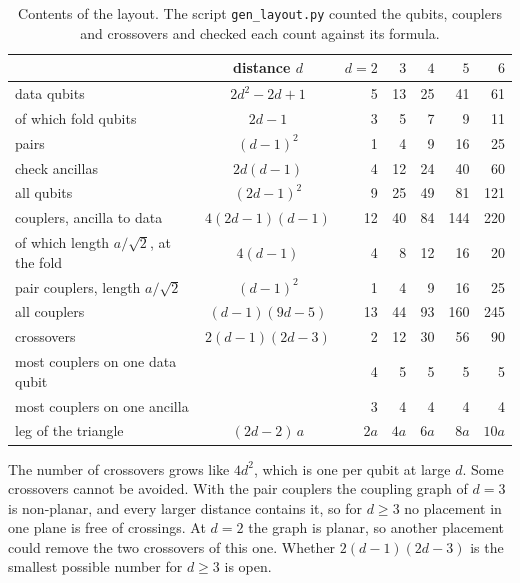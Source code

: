 \documentclass[11pt,a4paper]{article}
\begin{document}
\begin{table}[!ht]
\centering
\begin{tabular}{@{}lcrrrrr@{}}
\toprule
 & distance $d$ & $d=2$ & $3$ & $4$ & $5$ & $6$\\
\midrule
data qubits & $2d^2-2d+1$ & 5 & 13 & 25 & 41 & 61\\
\quad of which fold qubits & $2d-1$ & 3 & 5 & 7 & 9 & 11\\
\quad pairs & $(d-1)^2$ & 1 & 4 & 9 & 16 & 25\\
check ancillas & $2d(d-1)$ & 4 & 12 & 24 & 40 & 60\\
all qubits & $(2d-1)^2$ & 9 & 25 & 49 & 81 & 121\\
\midrule
couplers, ancilla to data & $4(2d-1)(d-1)$ & 12 & 40 & 84 & 144 & 220\\
\quad of which length $a/\sqrt2$, at the fold & $4(d-1)$ & 4 & 8 & 12 & 16 & 20\\
pair couplers, length $a/\sqrt2$ & $(d-1)^2$ & 1 & 4 & 9 & 16 & 25\\
all couplers & $(d-1)(9d-5)$ & 13 & 44 & 93 & 160 & 245\\
crossovers & $2(d-1)(2d-3)$ & 2 & 12 & 30 & 56 & 90\\
\midrule
most couplers on one data qubit & & 4 & 5 & 5 & 5 & 5\\
most couplers on one ancilla & & 3 & 4 & 4 & 4 & 4\\
leg of the triangle & $(2d-2)\,a$ & $2a$ & $4a$ & $6a$ & $8a$ & $10a$\\
\bottomrule
\end{tabular}
\caption{Contents of the layout. The script \texttt{gen\_layout.py} counted the qubits,
couplers and crossovers and checked each count against its formula.}
\label{tab:counts}
\end{table}

The number of crossovers grows like $4d^2$, which is one per qubit at large $d$. Some crossovers
cannot be avoided. With the pair couplers the coupling graph of $d=3$ is non-planar, and every
larger distance contains it, so for $d\ge3$ no placement in one plane is free of crossings.
At $d=2$ the graph is planar, so another placement could remove the two crossovers of this one.
Whether $2(d-1)(2d-3)$ is the smallest possible number for $d\ge3$ is open.
\end{document}
